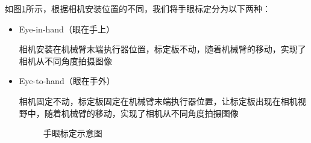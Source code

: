 \documentclass{article}
\begin{document}
如图\ref{手眼标定分类}所示，根据相机安装位置的不同，我们将手眼标定分为以下两种：
\begin{itemize}
	\item Eye-in-hand（眼在手上）
	
	相机安装在机械臂末端执行器位置，标定板不动，随着机械臂的移动，实现了相机从不同角度拍摄图像
	\item Eye-to-hand（眼在手外）
	
	相机固定不动，标定板固定在机械臂末端执行器位置，让标定板出现在相机视野中，随着机械臂的移动，实现了相机从不同角度拍摄图像
	\begin{figure}[H]
		\centering  %
		\caption{手眼标定示意图}    %
		\label{手眼标定分类}    %
	\end{figure}
\end{itemize}
\end{document}
